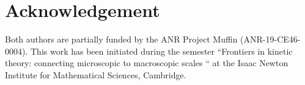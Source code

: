 \documentclass[11pt]{amsart}
\numberwithin{equation}{section}
\numberwithin{figure}{section}
\begin{document}
%
\section*{Acknowledgement}

Both authors are partially funded by the ANR Project Muffin
(ANR-19-CE46-0004). This work has been initiated during the semester
``Frontiers in kinetic theory: connecting microscopic to macroscopic
scales `` at the Isaac Newton Institute for Mathematical Sciences, Cambridge. 



\end{document}

